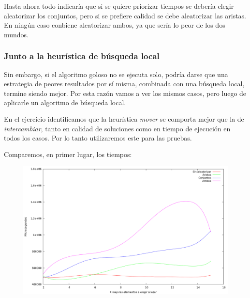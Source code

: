 Hasta ahora todo indicaría que si se quiere priorizar tiempos se debería elegir
aleatorizar los conjuntos, pero si se prefiere calidad se debe aleatorizar las
aristas. En ningún caso conbiene aleatorizar ambos, ya que sería lo peor de los
dos mundos.

\newpage \subsubsection{Junto a la heurística de búsqueda local}

Sin embargo, si el algoritmo goloso no se ejecuta solo, podría darse que una
estrategia de peores resultados por sí misma, combinada con una búsqueda local,
termine siendo mejor. Por esta razón vamos a ver los mismos casos, pero luego
de aplicarle un algoritmo de búsqueda local.

En el ejercicio identificamos que la heurística \textit{mover} se comporta
mejor que la de \textit{intercambiar}, tanto en calidad de soluciones como en
tiempo de ejecución en todos los casos. Por lo tanto utilizaremos este para las
pruebas.

Comparemos, en primer lugar, los tiempos:

\begin{figure}[H]
  \begin{center}
    \includegraphics[scale=0.35]{imagenes/grasp-local-x-tiempo.png}
  \end{center}
\end{figure}

